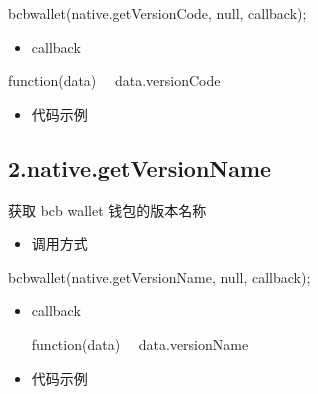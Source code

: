 \documentclass[letterpaper,10pt,english]{sphinxmanual}
\begin{document}
\begin{sphinxVerbatim}[commandchars=\\\{\}]
bcbwallet(\PYGZsq{}native.getVersionCode\PYGZsq{}, null, callback);
\end{sphinxVerbatim}
\begin{itemize}
\item {} 
callback

\end{itemize}

\begin{sphinxVerbatim}[commandchars=\\\{\}]
function(data) \PYGZob{}
　data.versionCode
\PYGZcb{}
\end{sphinxVerbatim}
\begin{itemize}
\item {} 
代码示例

\end{itemize}

\begin{sphinxVerbatim}[commandchars=\\\{\}]
    
\end{sphinxVerbatim}


\subsection{2.native.getVersionName}
\label{\detokenize{jsapi:native-getversionname}}
获取 bcb wallet 钱包的版本名称
\begin{itemize}
\item {} 
调用方式

\end{itemize}

\begin{sphinxVerbatim}[commandchars=\\\{\}]
bcbwallet(\PYGZsq{}native.getVersionName\PYGZsq{}, null, callback);
\end{sphinxVerbatim}
\begin{itemize}
\item {} 
callback

\begin{sphinxVerbatim}[commandchars=\\\{\}]
function(data) \PYGZob{}
　data.versionName
\PYGZcb{}
\end{sphinxVerbatim}

\item {} 
代码示例

\end{itemize}
\end{document}
